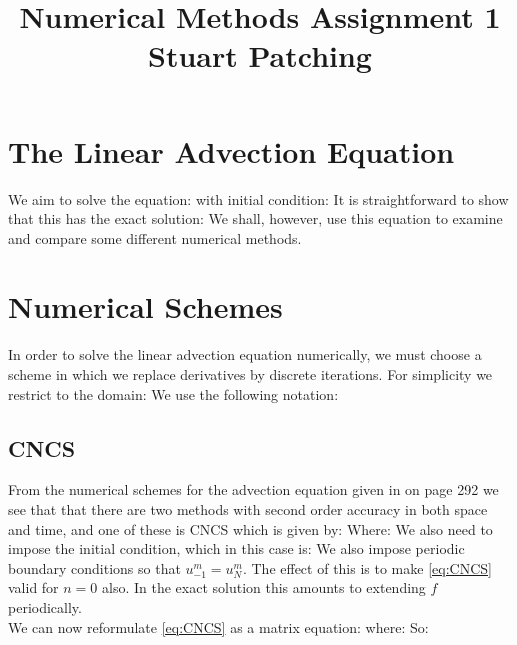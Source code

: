 \documentclass[10pt]{article}
\begin{document}
\title{Numerical Methods Assignment 1\\Stuart Patching}

\section{The Linear Advection Equation}

We aim to solve the equation:
with initial condition:
It is straightforward to show that this has the exact solution:
We shall, however, use this equation to examine and compare some different numerical methods.

\section{Numerical Schemes}

In order to solve the linear advection equation numerically, we must choose a scheme in which we replace derivatives by discrete iterations. For simplicity we restrict to the domain:
We use the following notation:

\subsection{CNCS}

From the numerical schemes for the advection equation given in \cite{MPE} on page 292 we see that that there are two methods with second order accuracy in both space and time, and one of these is CNCS which is given by:
Where:
We also need to impose the initial condition, which in this case is:
We also impose periodic boundary conditions so that $u^{m}_{-1} = u^{m}_{N}$. The effect of this is to make \eqref{eq:CNCS} valid for $n=0$ also. In the exact solution this amounts to extending $f$ periodically. \\

We can now reformulate \eqref{eq:CNCS} as a matrix equation:
where:
So:
\end{document}
